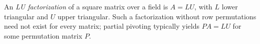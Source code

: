 
An \emph{LU factorization} of a square matrix over a field is $A=LU$, with $L$ lower triangular and $U$ upper triangular. Such a factorization without row permutations need not exist for every matrix; partial pivoting typically yields $PA=LU$ for some permutation matrix $P$.
